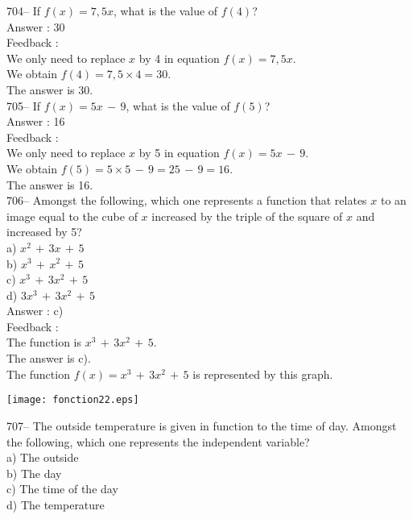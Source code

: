\documentclass[letterpaper, 12pt]{article}
\begin{document}
704-- If $f(x)=7,5x$, what is the value of $f(4)$?\\

Answer : 30\\

Feedback : \\
We only need to replace $x$ by 4 in equation $f(x)=7,5x$.  \\
We obtain $f(4)=7,5\times4=30$.\\
The answer is 30.\\

705-- If $f(x)=5x\,-\,9$, what is the value of $f(5)$?\\

Answer :  16\\

Feedback :  \\
We only need to replace $x$ by 5 in equation $f(x)=5x\,-\,9$.\\
We obtain $f(5)=5\times 5\,-\,9=25\,-\,9=16$.\\
The answer is 16.\\

706-- Amongst the following, which one represents a function that relates $x$ to an image equal to the cube of $x$ increased by the triple of the square of $x$ and increased by 5?\\
a) $x^{2}\,+\,3x \,+\,5$\\
b) $x^{3}\,+\,x^{2}\,+\,5$\\
c) $x^{3}\,+\,3x^{2}\,+\,5$\\
d) $3x^{3}\,+\,3x^{2}\,+\,5$\\

Answer : c)\\

Feedback : \\
The function is $x^{3}\,+\,3x^{2}\,+\,5$.\\
The answer is c).\\

The function $f(x)=x^{3}\,+\,3x^{2}\,+\,5$ is represented by this graph.\\
    \begin{center}
    \texttt{[image: fonction22.eps]}
    \end{center}


707-- The outside temperature is given in function to the time of day.  Amongst the following, which one represents the independent variable?\\
a) The outside\\
b) The day\\
c) The time of the day\\
d) The temperature\\
\end{document}
